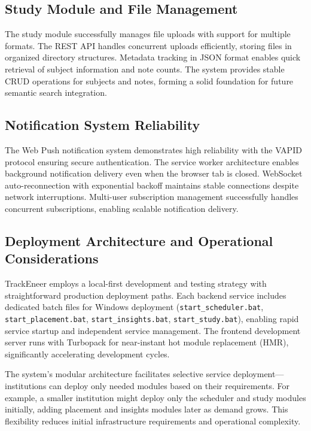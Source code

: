 \documentclass[conference]{IEEEtran}
\begin{document}
\subsection{Study Module and File Management}
The study module successfully manages file uploads with support for multiple formats. The REST API handles concurrent uploads efficiently, storing files in organized directory structures. Metadata tracking in JSON format enables quick retrieval of subject information and note counts. The system provides stable CRUD operations for subjects and notes, forming a solid foundation for future semantic search integration.

\subsection{Notification System Reliability}
The Web Push notification system demonstrates high reliability with the VAPID protocol ensuring secure authentication. The service worker architecture enables background notification delivery even when the browser tab is closed. WebSocket auto-reconnection with exponential backoff maintains stable connections despite network interruptions. Multi-user subscription management successfully handles concurrent subscriptions, enabling scalable notification delivery.

\subsection{Deployment Architecture and Operational Considerations}
TrackEneer employs a local-first development and testing strategy with straightforward production deployment paths. Each backend service includes dedicated batch files for Windows deployment (\texttt{start\_scheduler.bat}, \texttt{start\_placement.bat}, \texttt{start\_insights.bat}, \texttt{start\_study.bat}), enabling rapid service startup and independent service management. The frontend development server runs with Turbopack for near-instant hot module replacement (HMR), significantly accelerating development cycles.

The system's modular architecture facilitates selective service deployment—institutions can deploy only needed modules based on their requirements. For example, a smaller institution might deploy only the scheduler and study modules initially, adding placement and insights modules later as demand grows. This flexibility reduces initial infrastructure requirements and operational complexity.
\end{document}
